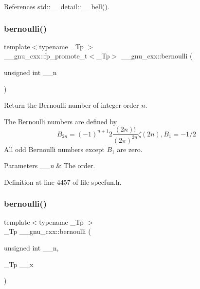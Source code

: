 References std\+::\+\_\+\+\_\+detail\+::\+\_\+\+\_\+bell().

\mbox{\label{group__gnu__math__spec__func_gad339f0011df1967ec6c9e55bd1547bf4}} 
\subsubsection{\texorpdfstring{bernoulli()}{bernoulli()}\hspace{0.1cm}{\footnotesize\ttfamily [1/2]}}
{\footnotesize\ttfamily template$<$typename \+\_\+\+Tp $>$ \\
\+\_\+\+\_\+gnu\+\_\+cxx\+::fp\+\_\+promote\+\_\+t$<$\+\_\+\+Tp$>$ \+\_\+\+\_\+gnu\+\_\+cxx\+::bernoulli (\begin{DoxyParamCaption}\item[{unsigned int}]{\+\_\+\+\_\+n }\end{DoxyParamCaption})\hspace{0.3cm}{\ttfamily [inline]}}

Return the Bernoulli number of integer order $ n $.

The Bernoulli numbers are defined by \[ B_{2n} = (-1)^{n+1} 2\frac{(2n)!}{(2\pi)^{2n}} \zeta(2n), B_1 = -1/2 \] All odd Bernoulli numbers except $ B_1 $ are zero.


\begin{DoxyParams}{Parameters}
{\em \+\_\+\+\_\+n} & The order. \\
\hline
\end{DoxyParams}


Definition at line 4457 of file specfun.\+h.

\mbox{\label{group__gnu__math__spec__func_ga140e17e038ab0e3875c1b3fad09bc991}} 
\subsubsection{\texorpdfstring{bernoulli()}{bernoulli()}\hspace{0.1cm}{\footnotesize\ttfamily [2/2]}}
{\footnotesize\ttfamily template$<$typename \+\_\+\+Tp $>$ \\
\+\_\+\+Tp \+\_\+\+\_\+gnu\+\_\+cxx\+::bernoulli (\begin{DoxyParamCaption}\item[{unsigned int}]{\+\_\+\+\_\+n,  }\item[{\+\_\+\+Tp}]{\+\_\+\+\_\+x }\end{DoxyParamCaption})\hspace{0.3cm}{\ttfamily [inline]}}

